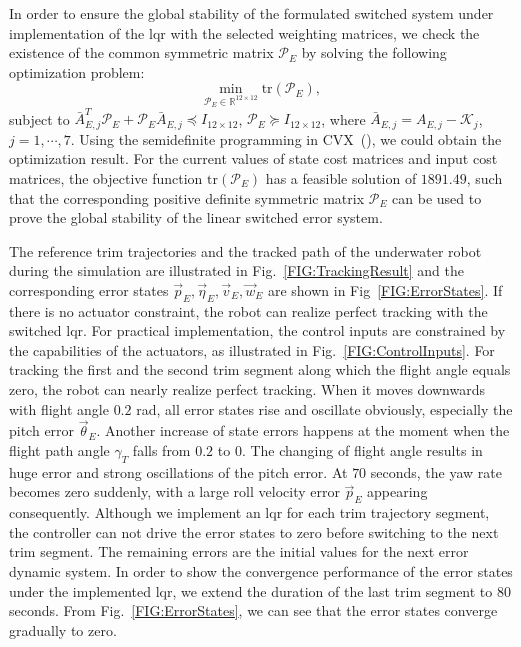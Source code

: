 In order to ensure the global stability of the formulated switched system under implementation of the \ac{lqr} with the selected weighting matrices, we check the existence of the common symmetric matrix $\mathcal{P}_{E}$ by solving the following optimization problem: 
\begin{equation}
	\min_{\mathcal{P}_{E}\in \mathbb{R}^{12 \times 12}}\mathrm{tr}(\mathcal{P}_{E}),
\end{equation} 
subject to $\bar{A}_{E,j}^{T}\mathcal{P}_{E}+\mathcal{P}_{E}\bar{A}_{E,j} \preceq I_{12 \times 12}$, $\mathcal{P}_{E} \succeq I_{12 \times 12}$, where $\bar{A}_{E,j}=A_{E,j}-\mathcal{K}_{j}$, $j=1, \cdots, 7$. Using the semidefinite programming in CVX~(\cite{c12,c13}), we could obtain the optimization result. For the current values of state cost matrices and input cost matrices, the objective function $\mathrm{tr}(\mathcal{P}_{E})$ has a feasible solution of $1891.49$, such that the corresponding positive definite symmetric matrix $\mathcal{P}_{E}$ can be used to prove the global stability of the linear switched error system. 

The reference trim trajectories and the tracked path of the underwater robot during the simulation are illustrated in Fig.~\ref{FIG:TrackingResult} and the corresponding error states $\vec{p}_{E}, \vec{\eta}_{E}, \vec{v}_{E}, \vec{w}_{E}$ are shown in Fig~\ref{FIG:ErrorStates}. If there is no actuator constraint, the robot can realize perfect tracking with the switched \ac{lqr}. For practical implementation, the control inputs are constrained by the capabilities of the actuators, as illustrated in Fig.~\ref{FIG:ControlInputs}. For tracking the first and the second trim segment along which the flight angle equals zero, the robot can nearly realize perfect tracking. When it moves downwards with flight angle $0.2$ rad, all error states rise and oscillate obviously, especially the pitch error $\vec{\theta}_{E}$. Another increase of state errors happens at the moment when the flight path angle $\gamma_{T}$ falls from $0.2$ to $0$. The changing of flight angle results in huge error and strong oscillations of the pitch error. At $70$ seconds, the yaw rate becomes zero suddenly, with a large roll velocity error $\vec{p}_{E}$ appearing consequently. Although we implement an \ac{lqr} for each trim trajectory segment, the controller can not drive the error states to zero before switching to the next trim segment. The remaining errors are the initial values for the next error dynamic system. In order to show the convergence performance of the error states under the implemented \ac{lqr}, we extend the duration of the last trim segment to $80$ seconds. From Fig.~\ref{FIG:ErrorStates}, we can see that the error states converge gradually to zero. 

